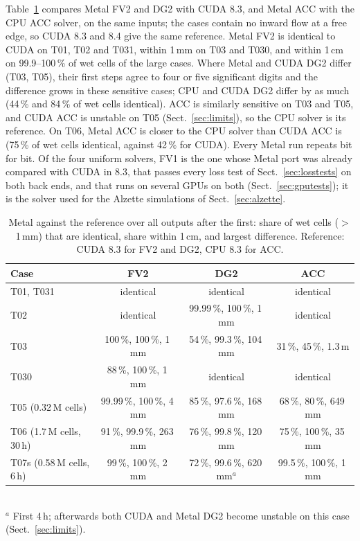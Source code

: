 \documentclass[gmd, manuscript]{copernicus}
\begin{document}
Table~\ref{tab:metal} compares Metal FV2 and DG2 with CUDA 8.3, and Metal ACC
with the CPU ACC solver, on the same inputs; the cases contain no inward
flow at a free edge, so CUDA 8.3 and 8.4 give the same reference. Metal FV2
is identical to CUDA on T01, T02 and T031, within 1\,mm on T03 and T030, and
within 1\,cm on 99.9--100\,\% of wet cells of the large cases. Where Metal and CUDA DG2 differ (T03, T05), their first steps agree to
four or five significant digits and the difference grows in these sensitive
cases; CPU and CUDA DG2 differ by as much (44\,\% and 84\,\% of wet cells
identical). ACC is similarly sensitive on T03 and T05, and CUDA ACC is
unstable on T05 (Sect.~\ref{sec:limits}), so the CPU solver is its reference.
On T06, Metal ACC is closer to the CPU solver than CUDA ACC is (75\,\% of
wet cells identical, against 42\,\% for CUDA). Every Metal run repeats bit
for bit. Of the four uniform solvers, FV1 is the one whose Metal port was
already compared with CUDA in 8.3, that passes every loss test of
Sect.~\ref{sec:losstests} on both back ends, and that runs on several GPUs on
both (Sect.~\ref{sec:gputests}); it is the solver used for the Alzette
simulations of Sect.~\ref{sec:alzette}.

\begin{table}[t]
\caption{Metal against the reference over all outputs after the first: share
of wet cells ($>$1\,mm) that are identical, share within 1\,cm, and largest
difference. Reference: CUDA 8.3 for FV2 and DG2, CPU 8.3 for ACC.}
\label{tab:metal}
\centering\small
\begin{tabular}{@{}lccc@{}}
\toprule
Case & FV2 & DG2 & ACC \\
\midrule
T01, T031 & identical & identical & identical \\
T02 & identical & 99.99\,\%, 100\,\%, 1\,mm & identical \\
T03 & 100\,\%, 100\,\%, 1\,mm & 54\,\%, 99.3\,\%, 104\,mm & 31\,\%, 45\,\%, 1.3\,m \\
T030 & 88\,\%, 100\,\%, 1\,mm & identical & identical \\
T05 (0.32\,M cells) & 99.99\,\%, 100\,\%, 4\,mm & 85\,\%, 97.6\,\%, 168\,mm & 68\,\%, 80\,\%, 649\,mm \\
T06 (1.7\,M cells, 30\,h) & 91\,\%, 99.9\,\%, 263\,mm & 76\,\%, 99.8\,\%, 120\,mm & 75\,\%, 100\,\%, 35\,mm \\
T07s (0.58\,M cells, 6\,h) & 99\,\%, 100\,\%, 2\,mm & 72\,\%, 99.6\,\%, 620\,mm$^{a}$ & 99.5\,\%, 100\,\%, 1\,mm \\
\bottomrule
\end{tabular}
\\[2pt]{\footnotesize $^{a}$ First 4\,h; afterwards both CUDA and Metal DG2
become unstable on this case (Sect.~\ref{sec:limits}).}
\end{table}
\end{document}

